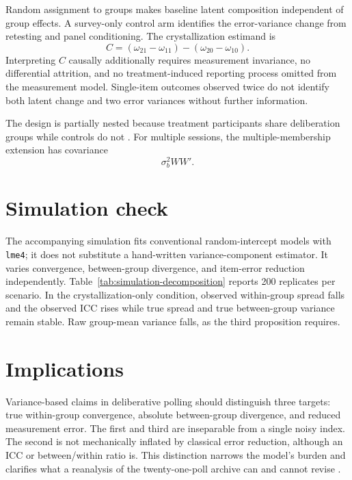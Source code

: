 \documentclass[11pt]{article}
\begin{document}
Random assignment to groups makes baseline latent composition independent of
group effects. A survey-only control arm identifies the error-variance change
from retesting and panel conditioning. The crystallization estimand is
\[
C=(\omega_{21}-\omega_{11})-(\omega_{20}-\omega_{10}).
\]
Interpreting $C$ causally additionally requires measurement invariance, no
differential attrition, and no treatment-induced reporting process omitted from
the measurement model. Single-item outcomes observed twice do not identify both
latent change and two error variances without further information.

The design is partially nested because treatment participants share deliberation
groups while controls do not \citep{bauer2008,roberts2013}. For multiple
sessions, the multiple-membership extension has covariance
\[
\sigma_b^2WW'.
\]

\section{Simulation check}

The accompanying simulation fits conventional random-intercept models with
\texttt{lme4}; it does not substitute a hand-written variance-component estimator.
It varies convergence, between-group divergence, and item-error reduction
independently. Table~\ref{tab:simulation-decomposition} reports 200 replicates per
scenario. In the crystallization-only condition, observed within-group spread
falls and the observed ICC rises while true spread and true between-group
variance remain stable. Raw group-mean variance falls, as the third proposition
requires.



\section{Implications}

Variance-based claims in deliberative polling should distinguish three targets:
true within-group convergence, absolute between-group divergence, and reduced
measurement error. The first and third are inseparable from a single noisy index.
The second is not mechanically inflated by classical error reduction, although an
ICC or between/within ratio is. This distinction narrows the model's burden and
clarifies what a reanalysis of the twenty-one-poll archive can and cannot revise
\citep{luskin2022}.



\end{document}
